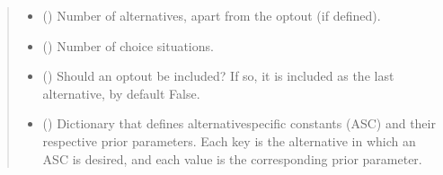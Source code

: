 \documentclass[a4paper,10pt,english]{sphinxhowto}
\begin{document}
\begin{fulllineitems}
\begin{quote}
\begin{description}
\begin{itemize}
\begin{itemize}
\end{itemize}


\item {} 
\sphinxAtStartPar
{} () \textendash{} Number of alternatives, apart from the opt\sphinxhyphen{}out (if defined).

\item {} 
\sphinxAtStartPar
{} () \textendash{} Number of choice situations.

\item {} 
\sphinxAtStartPar
{} (\sphinxstyleliteralemphasis{\sphinxupquote{, }}) \textendash{} Should an opt\sphinxhyphen{}out be included? If so, it is included as the last alternative,
by default False.

\item {} 
\sphinxAtStartPar
{} (\sphinxstyleliteralemphasis{\sphinxupquote{, }}) \textendash{} Dictionary that defines alternative\sphinxhyphen{}specific constants (ASC) and their respective
prior parameters. Each key is the alternative in which an ASC is desired, and
each value is the corresponding prior parameter.

\end{itemize}

\end{description}\end{quote}


\end{fulllineitems}
\end{document}

